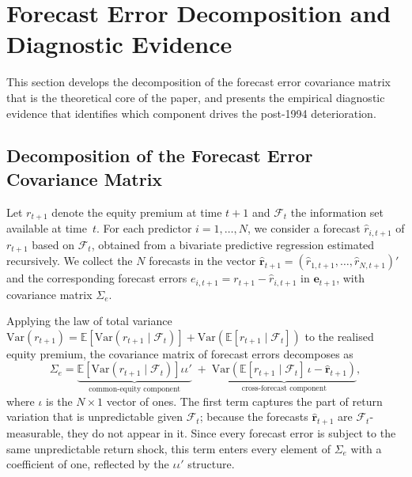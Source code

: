 \documentclass[a4paper,11pt]{article}
\begin{document}
\section{Forecast Error Decomposition and Diagnostic Evidence}\label{sec:decomposition}

This section develops the decomposition of the forecast error covariance
matrix that is the theoretical core of the paper, and presents the
empirical diagnostic evidence that identifies which component drives the
post-1994 deterioration.

\subsection{Decomposition of the Forecast Error Covariance Matrix}\label{subsec:decomposition-theory}

Let $r_{t+1}$ denote the equity premium at time $t+1$ and $\mathcal{F}_t$
the information set available at time~$t$. For each predictor
$i = 1, \ldots, N$, we consider a forecast $\hat{r}_{i,t+1}$ of $r_{t+1}$
based on $\mathcal{F}_t$, obtained from a bivariate predictive regression
estimated recursively. We collect the $N$ forecasts in the vector
$\hat{\mathbf{r}}_{t+1} = (\hat{r}_{1,t+1}, \ldots, \hat{r}_{N,t+1})'$ and
the corresponding forecast errors $e_{i,t+1} = r_{t+1} - \hat{r}_{i,t+1}$
in $\mathbf{e}_{t+1}$, with covariance matrix $\Sigma_e$.

Applying the law of total variance
$\mathrm{Var}(r_{t+1}) =
\mathbb{E}[\mathrm{Var}(r_{t+1} \mid \mathcal{F}_t)] +
\mathrm{Var}(\mathbb{E}[r_{t+1} \mid \mathcal{F}_t])$ to the realised
equity premium, the covariance matrix of forecast errors decomposes as
\begin{equation}\label{eq:ltv-decomp}
    \Sigma_e =
    \underbrace{\mathbb{E}\!\left[\mathrm{Var}(r_{t+1} \mid \mathcal{F}_t)
        \right]\iota\iota'}_{\text{common-equity component}}
    \;+\;
    \underbrace{\mathrm{Var}\!\left(\mathbb{E}[r_{t+1} \mid \mathcal{F}_t]
        \,\iota - \hat{\mathbf{r}}_{t+1}\right)}_{\text{cross-forecast component}},
\end{equation}
where $\iota$ is the $N \times 1$ vector of ones. The first term captures
the part of return variation that is unpredictable given
$\mathcal{F}_t$; because the forecasts $\hat{\mathbf{r}}_{t+1}$ are
$\mathcal{F}_t$-measurable, they do not appear in it. Since every forecast
error is subject to the same unpredictable return shock, this term enters
every element of $\Sigma_e$ with a coefficient of one, reflected by the
$\iota\iota'$ structure.
\end{document}
